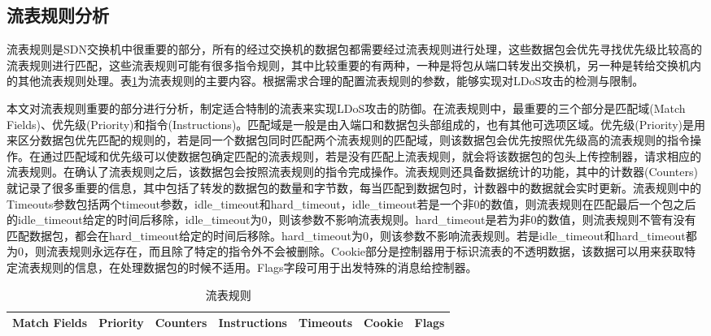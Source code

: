 \subsection{流表规则分析}
\label{chap4:flowruleanalysis}

流表规则是SDN交换机中很重要的部分，所有的经过交换机的数据包都需要经过流表规则进行处理，这些数据包会优先寻找优先级比较高的流表规则进行匹配，这些流表规则可能有很多指令规则，其中比较重要的有两种，一种是将包从端口转发出交换机，另一种是转给交换机内的其他流表规则处理。表\ref{table:flowrule}为流表规则的主要内容。根据需求合理的配置流表规则的参数，能够实现对LDoS攻击的检测与限制。

本文对流表规则重要的部分进行分析，制定适合特制的流表来实现LDoS攻击的防御。在流表规则中，最重要的三个部分是匹配域(Match Fields)、优先级(Priority)和指令(Instructions)。匹配域是一般是由入端口和数据包头部组成的，也有其他可选项区域。优先级(Priority)是用来区分数据包优先匹配的规则的，若是同一个数据包同时匹配两个流表规则的匹配域，则该数据包会优先按照优先级高的流表规则的指令操作。在通过匹配域和优先级可以使数据包确定匹配的流表规则，若是没有匹配上流表规则，就会将该数据包的包头上传控制器，请求相应的流表规则。在确认了流表规则之后，该数据包会按照流表规则的指令完成操作。流表规则还具备数据统计的功能，其中的计数器(Counters)就记录了很多重要的信息，其中包括了转发的数据包的数量和字节数，每当匹配到数据包时，计数器中的数据就会实时更新。流表规则中的Timeouts参数包括两个timeout参数，idle\_timeout和hard\_timeout，idle\_timeout若是一个非0的数值，则流表规则在匹配最后一个包之后的idle\_timeout给定的时间后移除，idle\_timeout为0，则该参数不影响流表规则。hard\_timeout是若为非0的数值，则流表规则不管有没有匹配数据包，都会在hard\_timeout给定的时间后移除。hard\_timeout为0，则该参数不影响流表规则。若是idle\_timeout和hard\_timeout都为0，则流表规则永远存在，而且除了特定的指令外不会被删除。Cookie部分是控制器用于标识流表的不透明数据，该数据可以用来获取特定流表规则的信息，在处理数据包的时候不适用。Flags字段可用于出发特殊的消息给控制器。


\begin{table}[htbp]
	\centering  %
	\caption{流表规则}  %
	\label{table:flowrule}  %
	\begin{tabular}{|c|c|c|c|c|c|c|}  
		\hline  %
        Match Fields & Priority & Counters & Instructions & Timeouts & Cookie & Flags \\  %
        \hline
		
	\end{tabular}
\end{table}

